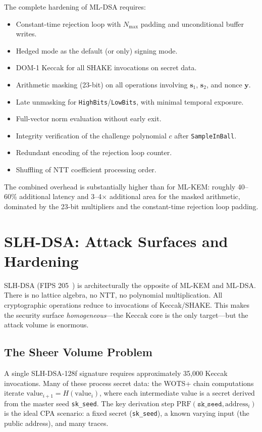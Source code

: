 The complete hardening of ML-DSA requires:
\begin{itemize}
\item Constant-time rejection loop with $N_{\max}$ padding and unconditional buffer writes.
\item Hedged mode as the default (or only) signing mode.
\item DOM-1 Keccak for all SHAKE invocations on secret data.
\item Arithmetic masking (23-bit) on all operations involving $\mathbf{s}_1$, $\mathbf{s}_2$, and nonce $\mathbf{y}$.
\item Late unmasking for \texttt{HighBits}/\texttt{LowBits}, with minimal temporal exposure.
\item Full-vector norm evaluation without early exit.
\item Integrity verification of the challenge polynomial $c$ after \texttt{SampleInBall}.
\item Redundant encoding of the rejection loop counter.
\item Shuffling of NTT coefficient processing order.
\end{itemize}

The combined overhead is substantially higher than for ML-KEM: roughly 40--60\% additional latency and 3--4$\times$ additional area for the masked arithmetic, dominated by the 23-bit multipliers and the constant-time rejection loop padding.


\section{SLH-DSA: Attack Surfaces and Hardening}
\label{sec:slhdsa-hardening}

SLH-DSA (FIPS 205~\cite{FIPS205}) is architecturally the opposite of ML-KEM and ML-DSA.  There is no lattice algebra, no NTT, no polynomial multiplication.  All cryptographic operations reduce to invocations of Keccak/SHAKE.  This makes the security surface \emph{homogeneous}---the Keccak core is the only target---but the attack volume is enormous.

\subsection{The Sheer Volume Problem}
\label{subsec:slhdsa-volume}

A single SLH-DSA-128f signature requires approximately 35,000 Keccak invocations.  Many of these process secret data: the WOTS+ chain computations iterate $\text{value}_{i+1} = H(\text{value}_i)$, where each intermediate value is a secret derived from the master seed \texttt{sk\_seed}.  The key derivation step $\text{PRF}(\texttt{sk\_seed}, \text{address}_i)$ is the ideal CPA scenario: a fixed secret (\texttt{sk\_seed}), a known varying input (the public address), and many traces.

